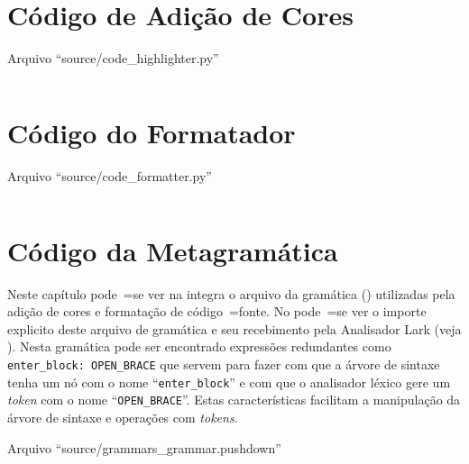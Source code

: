 \chapter{Código de Adição de Cores}

\begin{code}
\caption{Arquivo ``source/code\_highlighter.py''}
\label{codeHighlighterPy}
\inputminted{python3}{../source/code_highlighter.py}
\end{code}


\chapter{Código do Formatador}

\begin{code}
\caption{Arquivo ``source/code\_formatter.py''}
\label{codeFormatterPy}
\inputminted{python3}{../source/code_formatter.py}
\end{code}


\chapter{Código da Metagramática}

Neste capítulo pode~=se ver na integra o arquivo da gramática () utilizadas pela adição de cores e
formatação de código~=fonte.
No  pode~=se ver o importe explicito deste arquivo de gramática e
seu recebimento pela Analisador Lark (veja ).
Nesta gramática pode ser encontrado expressões redundantes como \texttt{enter_block:
OPEN_BRACE} que servem para fazer com que a árvore de sintaxe tenha um nó com o nome ``\texttt{enter_block}'' e
com que o analisador léxico gere um \textit{token} com o nome ``\texttt{OPEN_BRACE}''.
Estas características facilitam a manipulação da árvore de sintaxe e
operações com \textit{tokens}.
\begin{code}
\caption{Arquivo ``source/grammars\_grammar.pushdown''}
\label{grammarsGrammarPushdown}
\inputminted{antlr}{../source/grammars_grammar.pushdown}
\end{code}
